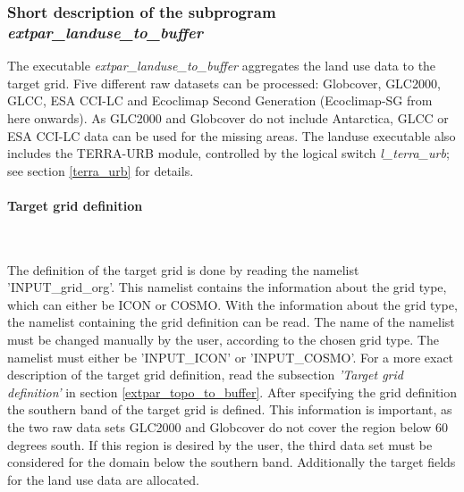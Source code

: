 \documentclass[a4paper,10pt,DIV14,BCOR1cm,titlepage,twoside]{scrartcl}
\begin{document}
\subsubsection{Short description of the subprogram \textit{extpar\_landuse\_to\_buffer}}
The executable \textit{extpar\_landuse\_to\_buffer} aggregates the land use data to the target grid. Five different raw datasets can be processed: Globcover, GLC2000, GLCC, ESA CCI-LC and Ecoclimap Second Generation (Ecoclimap-SG from here onwards). As GLC2000 and Globcover do not include Antarctica, GLCC or ESA CCI-LC data can be used for the missing areas. The landuse executable also includes the TERRA-URB module, controlled by the logical switch \textit{l\_terra\_urb}; see section \ref{terra_urb} for details. 
\paragraph{Target grid definition}\ \par\medskip\noindent
The definition of the target grid is done by reading the namelist 'INPUT\_grid\_org'. This namelist contains the information about the grid type, which can either be ICON or COSMO. With the information about the grid type, the namelist containing the grid definition can be read. The name of the namelist must be changed manually by the user, according to the chosen grid type. The namelist must either be 'INPUT\_ICON' or 'INPUT\_COSMO'. For a more exact description of the target grid definition, read the subsection \textit{'Target grid definition'} in section \ref{extpar_topo_to_buffer}. After specifying the grid definition the southern band of the target grid is defined. This information is important, as the two raw data sets GLC2000 and Globcover do not cover the region below 60 degrees south. If this region is desired by the user, the third data set must be considered for the domain below the southern band. Additionally the target fields for the land use data are allocated. \par\medskip\noindent
 
\end{document}
